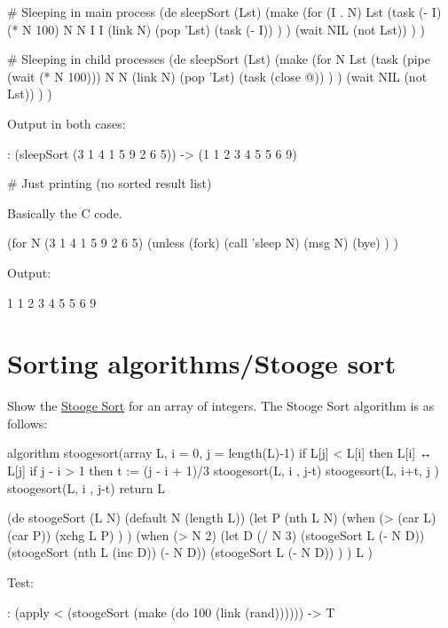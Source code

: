 \begin{wideverbatim}

# Sleeping in main process
(de sleepSort (Lst)
   (make
      (for (I . N) Lst
         (task (- I) (* N 100)  N N  I I
            (link N)
            (pop 'Lst)
            (task (- I)) ) )
      (wait NIL (not Lst)) ) )

# Sleeping in child processes
(de sleepSort (Lst)
   (make
      (for N Lst
         (task (pipe (wait (* N 100))) N N
            (link N)
            (pop 'Lst)
            (task (close @)) ) )
      (wait NIL (not Lst)) ) )

Output in both cases:

: (sleepSort (3 1 4 1 5 9 2 6 5))
-> (1 1 2 3 4 5 5 6 9)

# Just printing (no sorted result list)

Basically the C code.

(for N (3 1 4 1 5 9 2 6 5)
   (unless (fork)
      (call 'sleep N)
      (msg N)
      (bye) ) )

Output:

1
1
2
3
4
5
5
6
9

\end{wideverbatim}

\pagebreak{}
\section*{Sorting algorithms/Stooge sort}

Show the \href{http://en.wikipedia.org/wiki/Stooge\_sort}{Stooge Sort}
for an array of integers. The Stooge Sort algorithm is as follows:

\begin{wideverbatim}
algorithm stoogesort(array L, i = 0, j = length(L)-1)
     if L[j] < L[i] then
         L[i] ↔ L[j]
     if j - i > 1 then
         t := (j - i + 1)/3
         stoogesort(L, i  , j-t)
         stoogesort(L, i+t, j  )
         stoogesort(L, i  , j-t)
     return L
\end{wideverbatim}



\begin{wideverbatim}

(de stoogeSort (L N)
   (default N (length L))
   (let P (nth L N)
      (when (> (car L) (car P))
         (xchg L P) ) )
   (when (> N 2)
      (let D (/ N 3)
         (stoogeSort L (- N D))
         (stoogeSort (nth L (inc D)) (- N D))
         (stoogeSort L (- N D)) ) )
   L )

Test:

: (apply < (stoogeSort (make (do 100 (link (rand))))))
-> T

\end{wideverbatim}

